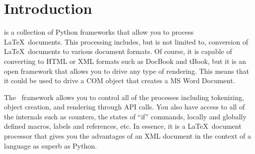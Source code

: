 
\chapter{Introduction}

\plasTeX is a collection of Python frameworks that allow you to process
\LaTeX\ documents.  This processing includes, but is not limited to,
conversion of \LaTeX\ documents to various document formats.  Of course, it is 
capable of converting to HTML or XML formats such as DocBook and tBook,
but it is an open framework that allows you to drive any type of 
rendering.  This means that it could be used to drive a COM object 
that creates a MS Word Document.

The \plasTeX\ framework allows you to control all of the 
processes including tokenizing, object creation, and rendering through 
API calls.  You also have access to all of the internals such as
counters, the states of ``if'' commands, locally and globally
defined macros, labels and references, etc.  In essence, it is a \LaTeX\
document processor that gives you the advantages of an XML
document in the context of a language as superb as Python. 

